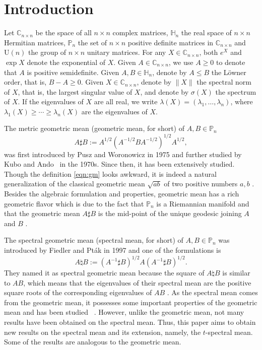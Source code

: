 \documentclass[12pt, reqno]{amsart}
\numberwithin{equation}{section}
\theoremstyle{definition}
\renewcommand{\ge}{\geqslant}
\renewcommand{\le}{\leqslant}
\def\Cnn{{\mathbb C}_{n\times n}}
\def\H{\mathbb H}
\def\P{\mathbb P}
\def\U{\mathrm U}
\begin{document}

\section{Introduction}
Let $\Cnn$ be the space of all $n \times n$ complex matrices, $\H_n$  the real space  of $n\times n$ Hermitian matrices,  $\P_n$  the set of $n\times n$ positive definite matrices in $\Cnn$
and $\U(n)$  the group of $n\times n$ unitary matrices. 
For any $X \in \Cnn$, both $e^X$ and $\exp X$  denote the exponential of $X$.
Given $A\in \Cnn$, we use $A\ge 0$ to denote that $A$ is positive semidefinite. Given $A, B\in \H_n$, denote by $A\le B$ the L\"owner order, that is, $B-A\ge 0$.  Given $X\in \Cnn$, denote by $\|X\|$ the spectral norm of $X$, that is, the largest singular value of $X$, and denote by $\sigma(X)$ the spectrum of $X$. If the eigenvalues of $X$ are all real, we write $\lambda(X) = (\lambda_1, \dots, \lambda_n)$, where $\lambda_1(X)\ge \cdots \ge \lambda_n(X)$ are the eigenvalues of $X$.

The metric geometric mean (geometric mean, for short) of $A, B\in \P_n$
\begin{equation}\label{eqn:gm}
A \sharp B := A^{1/2}(A^{-1/2}BA^{-1/2})^{1/2}A^{1/2},
\end{equation}
was first introduced by Pusz and Woronowicz \cite {PW75} in 1975 and further studied by Kubo and Ando~\cite{KA79} in the 1970s. Since then, it has been extensively studied. Though the definition \eqref{eqn:gm} looks awkward, it is indeed a natural generalization of the classical geometric mean $\sqrt {ab}$ of two positive numbers $a, b$ \cite{Bh07}.
Besides the algebraic formulation and properties, geometric mean has a rich geometric flavor which is due to the fact that $\P_n$ is a Riemannian manifold \cite {He78} and that the geometric mean $A \sharp B$  is the mid-point of  the unique geodesic joining $A$ and $B$ \cite{Bh07, LLT14}. 


The spectral geometric mean (spectral mean, for short) of $A, B\in \P_n$ was introduced by Fiedler and Pt\'ak \cite {FP97} in {1997 and one of the formulations is}
\begin{equation}\label{eqn:sm}
A \natural B := (A^{-1}\sharp B)^{1/2}A(A^{-1}\sharp B)^{1/2}.
\end{equation}
They named it as spectral geometric mean because the square of $A \natural B$ is similar to $AB$, which means that the eigenvalues of their spectral mean are the positive square roots of the corresponding eigenvalues of $AB$ \cite [Theorem 3.2 and Remark 3.4] {FP97}.
As the spectral mean comes from the geometric mean, it possesses some important properties of the geometric mean and has been studied ~\cite{KL15, LL04, LMW21, Li12}. However, unlike the geometric mean, not many results have been obtained on the spectral mean. Thus, this paper aims to obtain new results
on the spectral mean and its extension, namely, the $t$-spectral mean. Some of the results are analogous to the  geometric mean.
\end{document}
